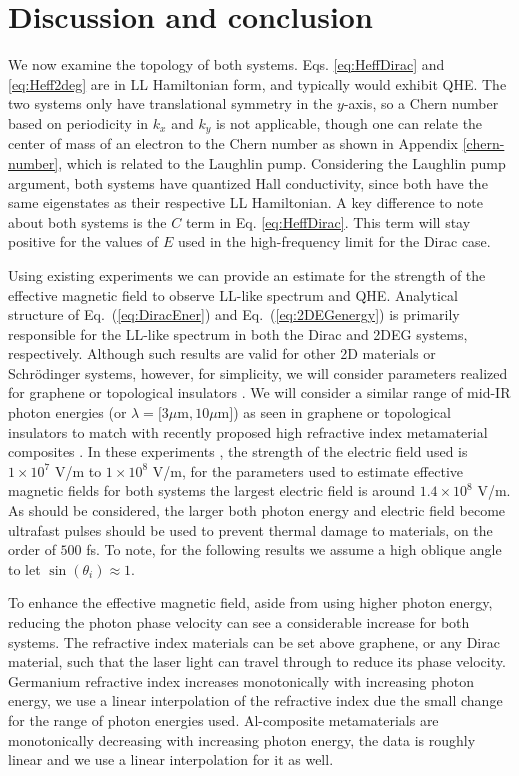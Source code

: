 \section{Discussion and conclusion}

We now examine the topology of both systems.
Eqs. \eqref{eq:HeffDirac} and \eqref{eq:Heff2deg} are in LL Hamiltonian form, and typically would exhibit QHE.
The two systems only have translational symmetry in the $y$-axis, so a Chern number based on periodicity in $k_x$ and $k_y$ is not applicable, though one can relate the center of mass of an electron to the Chern number as shown in Appendix \ref{chern-number}, which is related to the Laughlin pump.
Considering the Laughlin pump argument, both systems have quantized Hall conductivity, since both have the same eigenstates as their respective LL Hamiltonian.
A key difference to note about both systems is the $C$ term in Eq. \eqref{eq:HeffDirac}.
This term will stay positive for the values of $E$ used in the high-frequency limit for the Dirac case.

Using existing experiments \cite{YHW, JWM} we can provide an estimate for the strength of the effective magnetic field to observe LL-like spectrum and QHE.
Analytical structure of Eq.~(\ref{eq:DiracEner}) and Eq.~(\ref{eq:2DEGenergy}) is primarily responsible for the LL-like spectrum in both the Dirac and 2DEG systems, respectively.
Although such results are valid for other 2D materials or Schr\"{o}dinger systems, however, for simplicity, we will consider parameters realized for graphene or topological insulators \cite{YHW, JWM}.
We will consider a similar range of mid-IR photon energies (or $\lambda = [3\mu $m$ , 10\mu $m$]$) as seen in graphene or topological insulators \cite{YHW, JWM} to match with recently proposed high refractive index metamaterial composites \cite{shimFundamentalLimits}.
In these experiments \cite{YHW, JWM}, the strength of the electric field used is $1 \times 10^7$ V/m to $1 \times 10^8$ V/m, for the parameters used to estimate effective magnetic fields for both systems the largest electric field is around $1.4 \times 10^8$ V/m.
As should be considered, the larger both photon energy and electric field become ultrafast pulses should be used to prevent thermal damage to materials, on the order of $500$ fs.
To note, for the following results we assume a high oblique angle to let $\sin{(\theta_i)} \approx 1$.

To enhance the effective magnetic field, aside from using higher photon energy, reducing the photon phase velocity can see a considerable increase for both systems.
The refractive index materials can be set above graphene, or any Dirac material, such that the laser light can travel through to reduce its phase velocity.
Germanium refractive index increases monotonically with increasing photon energy, we use a linear interpolation of the refractive index due the small change for the range of photon energies used.
Al-composite metamaterials are monotonically decreasing with increasing photon energy, the data is roughly linear and we use a linear interpolation for it as well.

